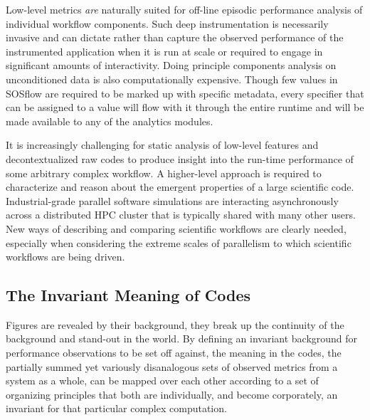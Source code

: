Low-level metrics \textit{are} naturally suited for off-line episodic
performance analysis of individual workflow components. Such deep
instrumentation is necessarily invasive and can dictate rather than
capture the observed performance of the instrumented application 
when it is run at scale or required to engage in significant amounts of
interactivity. Doing principle components analysis on unconditioned
data is also computationally expensive.  Though few values in SOSflow
are required to be marked up with specific metadata, every specifier
that can be assigned to a value will flow with it through the entire
runtime and will be made available to any of the analytics modules.

It is increasingly challenging for static analysis of low-level
features and decontextualized raw codes to produce insight into the
run-time performance of some arbitrary complex workflow.  A
higher-level approach is required to characterize and reason about the
emergent properties of a large scientific code. Industrial-grade
parallel software simulations are interacting asynchronously across a
distributed HPC cluster that is typically shared with many other
users. New ways of describing and comparing scientific workflows are
clearly needed, especially when considering the extreme scales of
parallelism to which scientific workflows are being driven.



\subsection{The Invariant Meaning of Codes}

Figures are revealed by their background, they break up the continuity
of the background and stand-out in the world. By defining an invariant
background for performance observations to be set off against, the
meaning in the codes, the partially summed yet variously disanalogous
sets of observed metrics from a system as a whole, can be mapped over
each other according to a set of organizing principles that both are
individually, and become corporately, an invariant for that particular
complex computation.

